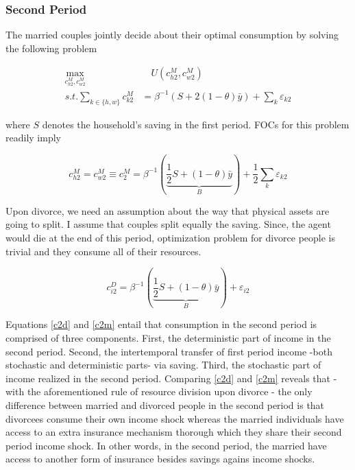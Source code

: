 \subsubsection{Second Period}
The married couples jointly decide about their optimal consumption by solving the following problem 

\begin{align}
\max_{c_{h2}^M, c_{w2}^M} & \quad U(c^M_{h2}, c_{w2}^M) \nonumber \\
s.t. \sum_{k \in \{h,w\}} c_{k2}^M & = \beta^{-1} \left (S + 2(1-\theta) \bar y \right ) + \sum_k \varepsilon_{k2} \nonumber
\end{align}

\noindent where $S$ denotes the household's saving in the first period. FOCs for this problem readily imply

\begin{equation}
c_{h2}^M = c_{w2}^M \equiv c_{2}^M = \beta^{-1} \left ( \underbrace{\dfrac{1}{2} S+  (1-\theta) \bar y}_{B}\right ) + \dfrac{1}{2}\sum_k \varepsilon_{k2} 
\label{c2m}
\end{equation}

Upon divorce, we need an assumption about the way that physical assets are going to split. I assume that couples split  equally the saving.  Since, the agent would die at the end of this period, optimization problem for divorce people is trivial and they consume all of their resources. 

\begin{equation}
c_{i2}^D = \beta^{-1} \left ( \underbrace{\dfrac{1}{2}  S +  (1-\theta) \bar y}_{B} \right ) + \varepsilon_{i2} 
\label{c2d}
\end{equation}

Equations \eqref{c2d} and \eqref{c2m} entail that consumption in the second period is comprised of three components. First, the deterministic part of income in the second period. Second, the intertemporal transfer of first period income -both stochastic and deterministic parts- via saving. Third, the stochastic part of income realized in the second period. Comparing \eqref{c2d} and \eqref{c2m}  reveals that - with the aforementioned rule of resource division upon divorce - the only difference between married and divorced people in the second period is that divorcees consume their own income shock whereas the married individuals have access to an extra insurance mechanism thorough which they share their second period income shock. In other words, in the second period, the married have access to another form of insurance besides savings agains income shocks. 


